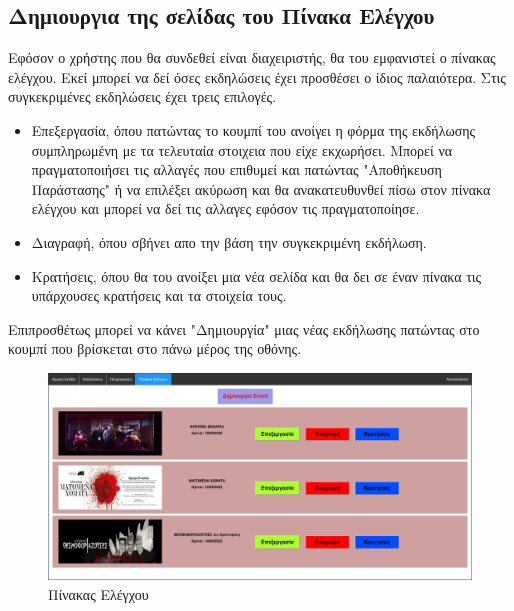 \documentclass{acmart}
\begin{document}
\subsection*{Δημιουργια της σελίδας του Πίνακα Ελέγχου}
Εφόσον ο χρήστης που θα συνδεθεί είναι διαχειριστής, θα του εμφανιστεί ο πίνακας ελέγχου.
Εκεί μπορεί να δεί όσες εκδηλώσεις έχει προσθέσει ο ίδιος παλαιότερα. Στις συγκεκριμένες 
εκδηλώσεις έχει τρεις επιλογές.
\begin{itemize}
  \item Επεξεργασία, όπου πατώντας το κουμπί του ανοίγει η φόρμα της εκδήλωσης συμπληρωμένη με 
  τα τελευταία στοιχεια που είχε εκχωρήσει. Μπορεί να πραγματοποιήσει τις αλλαγές που επιθυμεί 
  και πατώντας "Αποθήκευση Παράστασης" ή να επιλέξει ακύρωση και θα ανακατευθυνθεί πίσω στον 
  πίνακα ελέγχου και μπορεί να δεί τις αλλαγες εφόσον τις πραγματοποίησε. 
  \item Διαγραφή, όπου σβήνει απο την βάση την συγκεκριμένη εκδήλωση.
  \item Κρατήσεις, όπου θα του ανοίξει μια νέα σελίδα και θα δει σε έναν πίνακα τις 
  υπάρχουσες κρατήσεις και τα στοιχεία τους.
\end{itemize}
Επιπροσθέτως μπορεί να κάνει "Δημιουργία" μιας νέας εκδήλωσης πατώντας στο κουμπί που 
βρίσκεται στο πάνω μέρος της οθόνης.
\begin{figure}[H]
       \includegraphics[width=\textwidth]{control.png}
       \caption{Πίνακας Ελέγχου}
       \label{fig:control}
\end{figure}
\end{document}
